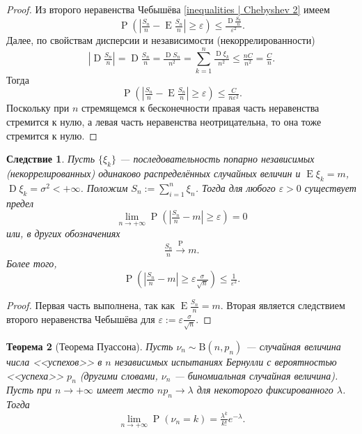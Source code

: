 \documentclass[12pt]{article}
\newtheorem{theorem}{Теорема}
\newtheorem{corollary}[theorem]{Следствие}
\numberwithin{theorem}{section}
\theoremstyle{definition}
\newcommand{\prob}{\operatorname{P}}
\newcommand{\expect}{\operatorname{E}}
\newcommand{\disp}{\operatorname{D}}
\begin{document}
	\begin{proof}
		Из второго неравенства Чебышёва \ref{inequalities | Chebyshev 2} имеем
		$$ \prob(|\tfrac{S_n}{n} - \expect\tfrac{S_n}{n}| \geqslant \varepsilon) \leqslant \tfrac{\disp\tfrac{S_n}{n}}{\varepsilon^2}. $$
		Далее, по свойствам дисперсии и независимости (некоррелированности)
		$$ |\disp\tfrac{S_n}{n}| = \disp\tfrac{S_n}{n} = \tfrac{\disp S_n}{n^2} = \sum\limits_{k = 1}^{n} \tfrac{\disp\xi_k}{n^2}
		\leqslant \tfrac{nC}{n^2} = \tfrac{C}{n}. $$
		Тогда
		$$ \prob(|\tfrac{S_n}{n} - \expect\tfrac{S_n}{n}| \geqslant \varepsilon) \leqslant \tfrac{C}{n\varepsilon^2}. $$
		Поскольку при $ n $ стремящемся к бесконечности правая часть неравенства стремится к нулю,
		а левая часть неравенства неотрицательна, то она тоже стремится к нулю.
	\end{proof}
	
	\begin{corollary}
		Пусть $ \{\xi_k\} $ --- последовательность попарно независимых (некоррелированных)
		одинаково распределённых случайных величин и $ \expect\xi_k = m $,
		$ \disp\xi_k = \sigma^2 < +\infty $. Положим $ S_n := \sum\limits_{i = 1}^{n} \xi_n $.
		Тогда для любого $ \varepsilon > 0 $ существует предел
		$$ \lim\limits_{n \to +\infty} \prob(|\tfrac{S_n}{n} - m| \geqslant \varepsilon) = 0 $$ 
		или, в других обозначениях 
		$$ \tfrac{S_n}{n} \overset{\prob}{\to} m. $$
		Более того,
		$$ \prob(|\tfrac{S_n}{n} - m| \geqslant \varepsilon\tfrac{\sigma}{\sqrt{n}}) \leqslant \tfrac{1}{\varepsilon^2}. $$
	\end{corollary}
	
	\begin{proof}
		Первая часть выполнена, так как $ \expect\tfrac{S_n}{n} = m $.
		Вторая является следствием второго неравенства Чебышёва
		для $ \varepsilon := \varepsilon\tfrac{\sigma}{\sqrt{n}} $.
	\end{proof}
	
	\begin{theorem}[Теорема Пуассона] \label{Poisson theorem}
		Пусть $ \nu_n \sim \mathrm{B}(n, p_n) $ --- случайная величина числа <<успехов>> в $ n $ независимых испытаниях Бернулли
		с вероятностью <<успеха>> $ p_n $ (другими словами, $ \nu_n $ --- биномиальная случайная величина).
		Пусть при $ n \to +\infty $ имеет место $ np_n \to \lambda $ для некоторого фиксированного $ \lambda $.
		Тогда
		$$ \lim\limits_{n \to + \infty} \prob(\nu_n = k) = \tfrac{\lambda^k}{k!}e^{-\lambda}. $$
	\end{theorem}
	
\end{document}
